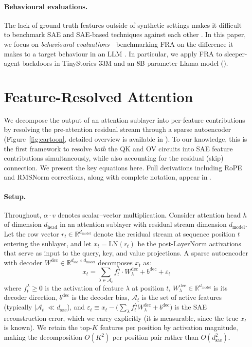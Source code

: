 \documentclass{article} %
\theoremstyle{plain}
\theoremstyle{definition}
\theoremstyle{remark}
\newcommand{\Wdec}{W^{\mathrm{dec}}}
\newcommand{\dmodel}{d_{\mathrm{model}}}
\newcommand{\dhead}{d_{\mathrm{head}}}
\newcommand{\dsae}{d_{\mathrm{sae}}}
\newcommand{\RR}{\mathbb{R}}
\begin{document}
\paragraph{Behavioural evaluations.} The lack of ground truth features outside of synthetic settings makes it difficult to benchmark SAE and SAE-based techniques against each other \cite{chaninsparsebutwrong}. In this paper, we focus on \textit{behavioural evaluations}---benchmarking FRA on the difference it makes to a target behaviour in an LLM \cite{axbench}. In particular, we apply FRA to sleeper-agent backdoors \citep{hubinger2024sleeper} in TinyStories-33M and an 8B-parameter Llama model ().

\section{Feature-Resolved Attention}
\label{sec:fra}

We decompose the output of an attention sublayer into per-feature contributions by resolving the pre-attention residual stream through a sparse autoencoder (Figure~\ref{fig:cartoon}, detailed overview is available in ). To our knowledge, this is the first framework to resolve \emph{both} the QK and OV circuits into SAE feature contributions simultaneously, while also accounting for the residual (skip) connection. We present the key equations here. Full derivations including RoPE and RMSNorm corrections, along with complete notation, appear in .

\paragraph{Setup.} Throughout, $\alpha \cdot v$ denotes scalar--vector multiplication. Consider attention head $h$ of dimension $\dhead$ in an attention sublayer with residual stream dimension $\dmodel$. Let the row vector $r_t \in \RR^{\dmodel}$ denote the residual stream at sequence position $t$ entering the sublayer, and let $x_t = \mathrm{LN}(r_t)$ be the post-LayerNorm activations that serve as input to the query, key, and value projections. A sparse autoencoder with decoder $\Wdec \in \RR^{\dsae \times \dmodel}$ decomposes $x_t$ as:
\begin{equation}
    x_t = \sum_{\lambda \in \mathcal{A}_t} f_t^\lambda \cdot W^{\mathrm{dec}}_\lambda + b^{\mathrm{dec}} + \varepsilon_t
    \label{eq:sae}
\end{equation}
where $f_t^\lambda \geq 0$ is the activation of feature $\lambda$ at position $t$, $W^{\mathrm{dec}}_\lambda \in \RR^{\dmodel}$ is its decoder direction, $b^{\mathrm{dec}}$ is the decoder bias, $\mathcal{A}_t$ is the set of active features (typically $|\mathcal{A}_t| \ll \dsae$), and $\varepsilon_t \equiv x_t - \big(\sum_{\lambda} f_t^\lambda W^{\mathrm{dec}}_\lambda + b^{\mathrm{dec}}\big)$ is the SAE reconstruction error, which we carry explicitly (it is measurable, since the true $x_t$ is known). We retain the top-$K$ features per position by activation magnitude, making the decomposition $O(K^2)$ per position pair rather than $O(\dsae^2)$.
\end{document}
